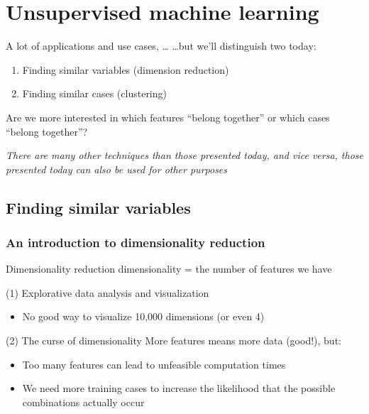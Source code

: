 \section[Unsupervised ML]{Unsupervised machine learning}

\begin{frame}{A lot of applications and use cases, \ldots}
\ldots but we'll distinguish two today:

\begin{enumerate}
\item Finding similar variables (dimension reduction)
\item Finding similar cases (clustering)
\end{enumerate}

\pause

Are we more interested in which features ``belong together'' or which cases ``belong together''? 

\emph{There are many other techniques than those presented today, and vice versa, those presented today can also be used for other purposes}

\end{frame}

\subsection{Finding similar variables}

\subsubsection{An introduction to dimensionality reduction}


\begin{frame}{Dimensionality reduction}
dimensionality = the number of features we have
\begin{block}{(1) Explorative data analysis and visualization}
\begin{itemize}
\item No good way to visualize 10,000 dimensions (or even 4)
\end{itemize}
\end{block}

\pause

\begin{block}{(2) The curse of dimensionality}
More features means more data (good!), but:
\begin{itemize}
\item Too many features can lead to unfeasible computation times
\item We need more training cases to increase the likelihood that the possible combinations actually occur
\end{itemize}
\end{block}
\end{frame}



